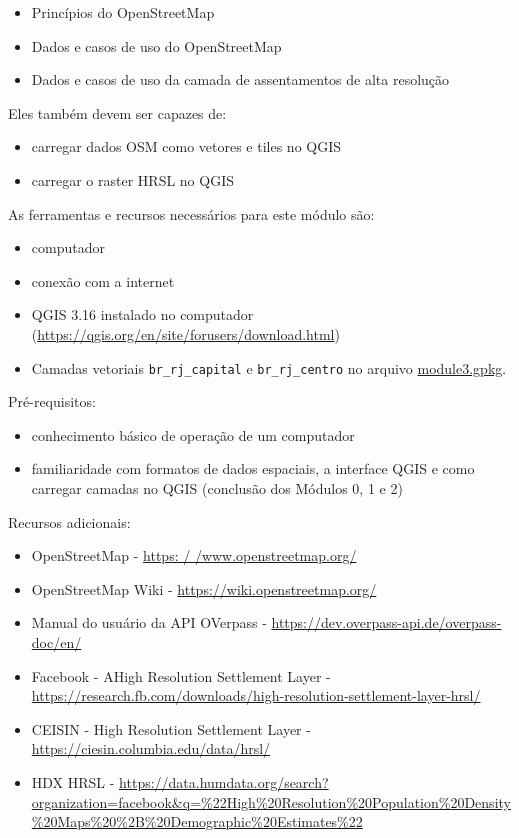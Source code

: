 \documentclass[
]{krantz}
\providecommand{\tightlist}{%
  \setlength{\itemsep}{0pt}\setlength{\parskip}{0pt}}
\begin{document}
\begin{itemize}
\tightlist
\item
  Princípios do OpenStreetMap
\item
  Dados e casos de uso do OpenStreetMap
\item
  Dados e casos de uso da camada de assentamentos de alta resolução
\end{itemize}

Eles também devem ser capazes de:

\begin{itemize}
\tightlist
\item
  carregar dados OSM como vetores e tiles no QGIS
\item
  carregar o raster HRSL no QGIS
\end{itemize}

As ferramentas e recursos necessários para este módulo são:

\begin{itemize}
\tightlist
\item
  computador
\item
  conexão com a internet
\item
  QGIS 3.16 instalado no computador (\url{https://qgis.org/en/site/forusers/download.html})
\item
  Camadas vetoriais \texttt{br\_rj\_capital} e \texttt{br\_rj\_centro} no arquivo \href{data/module3/modulo3.gpkg}{module3.gpkg}.
\end{itemize}

Pré-requisitos:

\begin{itemize}
\tightlist
\item
  conhecimento básico de operação de um computador
\item
  familiaridade com formatos de dados espaciais, a interface QGIS e como carregar camadas no QGIS (conclusão dos Módulos 0, 1 e 2)
\end{itemize}

Recursos adicionais:

\begin{itemize}
\tightlist
\item
  OpenStreetMap - \href{https://www.openstreetmap.org/}{https: / /www.openstreetmap.org/}
\item
  OpenStreetMap Wiki - \url{https://wiki.openstreetmap.org/}
\item
  Manual do usuário da API OVerpass - \url{https://dev.overpass-api.de/overpass-doc/en/}
\item
  Facebook - AHigh Resolution Settlement Layer - \url{https://research.fb.com/downloads/high-resolution-settlement-layer-hrsl/}
\item
  CEISIN - High Resolution Settlement Layer - \url{https://ciesin.columbia.edu/data/hrsl/}
\item
  HDX HRSL - \href{https://dados.humdata.org/search?organization=facebook\&q=\%22High\%20Resolution\%20Population\%20Density\%20Maps\%20\%2B\%20Demographic\%20Estimates\%22}{https://data.humdata.org/search?organization=facebook\&q=\%22High\%20Resolution\%20Population\%20Density\%20Maps\%20\%2B\%20Demographic\%20Estimates\%22}
\end{itemize}
\end{document}
